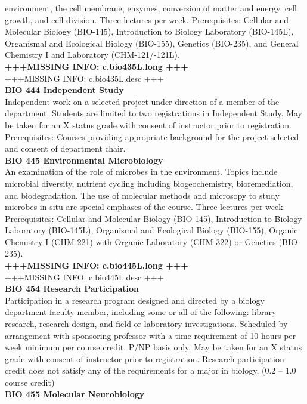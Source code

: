 \documentclass[
  letterpaper,
]{scrbook}
\begin{document}
environment, the cell membrane, enzymes, conversion of matter and
energy, cell growth, and cell division. Three lectures per week.
Prerequisites: Cellular and Molecular Biology (BIO-145), Introduction to
Biology Laboratory (BIO-145L), Organismal and Ecological Biology
(BIO-155), Genetics (BIO-235), and General Chemistry I and Laboratory
(CHM-121/-121L).\\
\textbf{+++MISSING INFO: c.bio435L.long +++}\\
+++MISSING INFO: c.bio435L.desc +++\\
\textbf{BIO 444 Independent Study}\\
Independent work on a selected project under direction of a member of
the department. Students are limited to two registrations in Independent
Study. May be taken for an X status grade with consent of instructor
prior to registration. Prerequisites: Courses providing appropriate
background for the project selected and consent of department chair.\\
\textbf{BIO 445 Environmental Microbiology}\\
An examination of the role of microbes in the environment. Topics
include microbial diversity, nutrient cycling including biogeochemistry,
bioremediation, and biodegradation. The use of molecular methods and
microsopy to study microbes in situ are special emphases of the course.
Three lectures per week. Prerequisites: Cellular and Molecular Biology
(BIO-145), Introduction to Biology Laboratory (BIO-145L), Organismal and
Ecological Biology (BIO-155), Organic Chemistry I (CHM-221) with Organic
Laboratory (CHM-322) or Genetics (BIO-235).\\
\textbf{+++MISSING INFO: c.bio445L.long +++}\\
+++MISSING INFO: c.bio445L.desc +++\\
\textbf{BIO 454 Research Participation}\\
Participation in a research program designed and directed by a biology
department faculty member, including some or all of the following:
library research, research design, and field or laboratory
investigations. Scheduled by arrangement with sponsoring professor with
a time requirement of 10 hours per week minimum per course credit. P/NP
basis only. May be taken for an X status grade with consent of
instructor prior to registration. Research participation credit does not
satisfy any of the requirements for a major in biology. (0.2 -- 1.0
course credit)\\
\textbf{BIO 455 Molecular Neurobiology}\\
\end{document}
